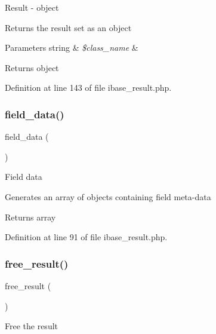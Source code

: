 Result -\/ object

Returns the result set as an object


\begin{DoxyParams}[1]{Parameters}
string & {\em \$class\+\_\+name} & \\
\hline
\end{DoxyParams}
\begin{DoxyReturn}{Returns}
object 
\end{DoxyReturn}


Definition at line 143 of file ibase\+\_\+result.\+php.

\mbox{\label{class_c_i___d_b__ibase__result_a84bffd65e53902ade1591716749a33e3}} 
\subsubsection{\texorpdfstring{field\_data()}{field\_data()}}
{\footnotesize\ttfamily field\+\_\+data (\begin{DoxyParamCaption}{ }\end{DoxyParamCaption})}

Field data

Generates an array of objects containing field meta-\/data

\begin{DoxyReturn}{Returns}
array 
\end{DoxyReturn}


Definition at line 91 of file ibase\+\_\+result.\+php.

\mbox{\label{class_c_i___d_b__ibase__result_aad2d98d6beb3d6095405356c6107b473}} 
\subsubsection{\texorpdfstring{free\_result()}{free\_result()}}
{\footnotesize\ttfamily free\+\_\+result (\begin{DoxyParamCaption}{ }\end{DoxyParamCaption})}

Free the result

